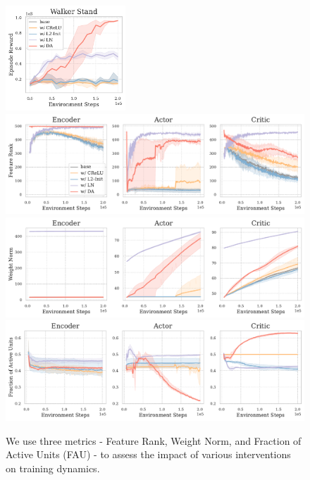 \begin{figure}[ht]
  \centering
  \includegraphics[width=0.4\textwidth]{Figures/5Appendix/Interventions_return.pdf}
  \includegraphics[width=\textwidth]{Figures/5Appendix/Interventions_Feature_Rank.pdf}
  \includegraphics[width=\textwidth]{Figures/5Appendix/Interventions_WN.pdf}
  \includegraphics[width=\textwidth]{Figures/5Appendix/Interventions_FAU.pdf}
  \caption{We use three metrics - Feature Rank, Weight Norm, and Fraction of Active Units (FAU) - to assess the impact of various interventions on training dynamics.}
\end{figure}

\newpage
